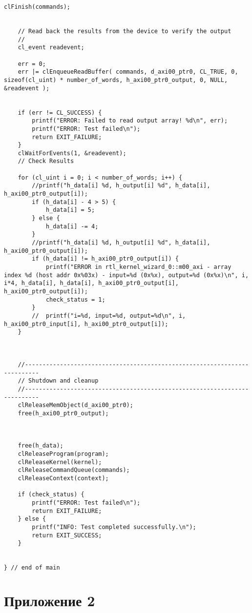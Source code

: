 \begin{lstlisting}[label=lst:lev_rec,caption=Содержимое файла host\_example.cpp]
	clFinish(commands);
	
	
	// Read back the results from the device to verify the output
	//
	cl_event readevent;
	
	err = 0;
	err |= clEnqueueReadBuffer( commands, d_axi00_ptr0, CL_TRUE, 0, sizeof(cl_uint) * number_of_words, h_axi00_ptr0_output, 0, NULL, &readevent );
	
	
	if (err != CL_SUCCESS) {
		printf("ERROR: Failed to read output array! %d\n", err);
		printf("ERROR: Test failed\n");
		return EXIT_FAILURE;
	}
	clWaitForEvents(1, &readevent);
	// Check Results
	
	for (cl_uint i = 0; i < number_of_words; i++) {
		//printf("h_data[i] %d, h_output[i] %d", h_data[i], h_axi00_ptr0_output[i]);
		if (h_data[i] - 4 > 5) {
			h_data[i] = 5;
		} else {
			h_data[i] -= 4;
		}
		//printf("h_data[i] %d, h_output[i] %d", h_data[i], h_axi00_ptr0_output[i]);
		if (h_data[i] != h_axi00_ptr0_output[i]) {
			printf("ERROR in rtl_kernel_wizard_0::m00_axi - array index %d (host addr 0x%03x) - input=%d (0x%x), output=%d (0x%x)\n", i, i*4, h_data[i], h_data[i], h_axi00_ptr0_output[i], h_axi00_ptr0_output[i]);
			check_status = 1;
		}
		//  printf("i=%d, input=%d, output=%d\n", i,  h_axi00_ptr0_input[i], h_axi00_ptr0_output[i]);
	}
	
	
	
	//--------------------------------------------------------------------------
	// Shutdown and cleanup
	//-------------------------------------------------------------------------- 
	clReleaseMemObject(d_axi00_ptr0);
	free(h_axi00_ptr0_output);
	
	
	
	free(h_data);
	clReleaseProgram(program);
	clReleaseKernel(kernel);
	clReleaseCommandQueue(commands);
	clReleaseContext(context);
	
	if (check_status) {
		printf("ERROR: Test failed\n");
		return EXIT_FAILURE;
	} else {
		printf("INFO: Test completed successfully.\n");
		return EXIT_SUCCESS;
	}
	
	
} // end of main

\end{lstlisting}


\chapter*{Приложение 2}

